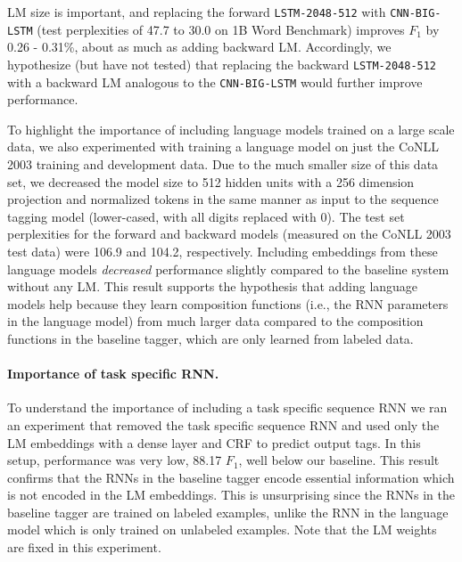 \documentclass[11pt,a4paper]{article}
\begin{document}
LM size is important, and replacing the forward \texttt{LSTM-2048-512} with \texttt{CNN-BIG-LSTM} (test perplexities of 47.7 to 30.0 on 1B Word Benchmark) improves $F_1$ by 0.26 - 0.31\%, about as much as adding backward LM. Accordingly, we hypothesize (but have not
tested) that replacing the backward \texttt{LSTM-2048-512} with a backward LM analogous to the
\texttt{CNN-BIG-LSTM} would further improve performance.

To highlight the importance of including language models trained on a large scale data, we also experimented
with training a language model on just the CoNLL 2003 training and development data.  Due to the much smaller size
of this data set, we decreased the model size to 512 hidden units with a 256 dimension projection and
normalized tokens in the same manner as input to the sequence tagging model (lower-cased, with all digits replaced
with 0).  The test set perplexities for the forward and backward models (measured on the CoNLL 2003 test data) were 106.9 and 104.2, respectively.  Including embeddings from these language models
\textit{decreased} performance slightly compared to the baseline system without any LM.
This result supports the hypothesis that adding language models help because they learn composition functions (i.e., the RNN parameters in the language model) from much larger data compared to the composition functions in the baseline tagger, which are only learned from labeled data.

\paragraph{Importance of task specific RNN.}
To understand the importance of including a task specific sequence RNN
we ran an experiment that removed the task specific sequence RNN and used only the LM embeddings with a dense layer and CRF to predict output tags.  In this setup, performance was very low, 88.17 $F_1$, well below our baseline.
This result confirms that the RNNs in the baseline tagger encode essential information which is not encoded in the LM embeddings.
This is unsurprising since the RNNs in the baseline tagger are trained on labeled examples, unlike the RNN in the language model which is only trained on unlabeled examples.
Note that the LM weights are fixed in this experiment.
\end{document}
